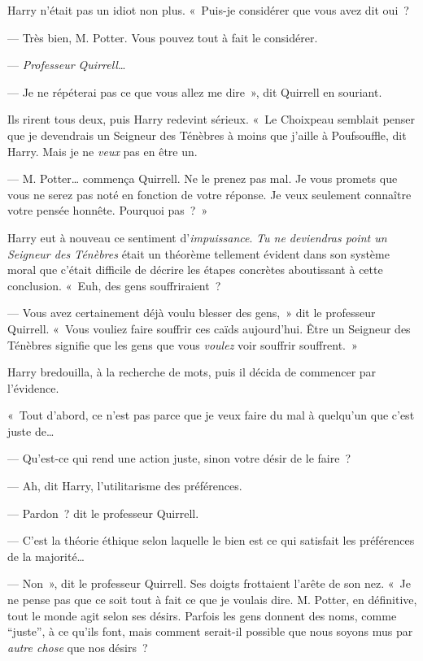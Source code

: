 Harry n'était pas un idiot non plus.
«~Puis-je considérer que vous avez dit oui~?

--- Très bien, M. Potter.
Vous pouvez tout à fait le considérer.

--- \emph{Professeur Quirrell}…

--- Je ne répéterai pas ce que vous allez me dire~», dit Quirrell en souriant.

Ils rirent tous deux, puis Harry redevint sérieux.
«~Le Choixpeau semblait penser que je devendrais un Seigneur des Ténèbres à moins que j'aille à Poufsouffle, dit Harry.
Mais je ne \emph{veux} pas en être un.

--- M. Potter… commença Quirrell.
Ne le prenez pas mal.
Je vous promets que vous ne serez pas noté en fonction de votre réponse.
Je veux seulement connaître votre pensée honnête.
Pourquoi pas~?~»

Harry eut à nouveau ce sentiment d'\emph{impuissance}.
\emph{Tu ne deviendras point un Seigneur des Ténèbres} était un théorème tellement évident dans son système moral que c'était difficile de décrire les étapes concrètes aboutissant à cette conclusion.
«~Euh, des gens souffriraient~?

--- Vous avez certainement déjà voulu blesser des gens,~» dit le professeur Quirrell.
«~Vous vouliez faire souffrir ces caïds aujourd'hui.
Être un Seigneur des Ténèbres signifie que les gens que vous \emph{voulez} voir souffrir souffrent.~»

Harry bredouilla, à la recherche de mots, puis il décida de commencer par l'évidence.

«~Tout d'abord, ce n'est pas parce que je veux faire du mal à quelqu'un que c'est juste de…

--- Qu'est-ce qui rend une action juste, sinon votre désir de le faire~?

--- Ah, dit Harry, l'utilitarisme des préférences.

--- Pardon~? dit le professeur Quirrell.

--- C'est la théorie éthique selon laquelle le bien est ce qui satisfait les préférences de la majorité…

--- Non~», dit le professeur Quirrell.
Ses doigts frottaient l'arête de son nez.
«~Je ne pense pas que ce soit tout à fait ce que je voulais dire.
M. Potter, en définitive, tout le monde agit selon ses désirs.
Parfois les gens donnent des noms, comme “juste”, à ce qu'ils font, mais comment serait-il possible que nous soyons mus par \emph{autre chose} que nos désirs~?

